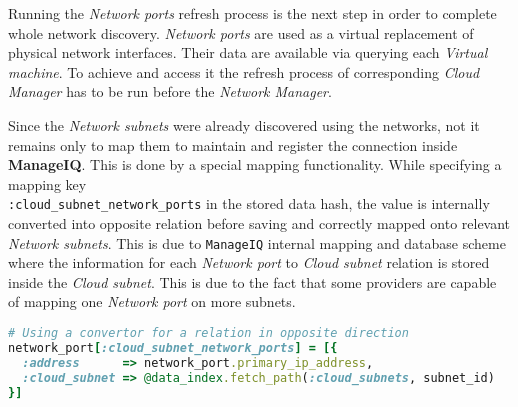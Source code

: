 Running the \emph{Network ports} refresh process is the next step in order to complete whole network discovery. \emph{Network ports} are used as a virtual replacement of physical network interfaces. Their data are available via querying each \emph{Virtual machine}. To achieve and access it the refresh process of corresponding \emph{Cloud Manager} has to be run before the \emph{Network Manager}.

Since the \emph{Network subnets} were already discovered using the networks, not it remains only to map them to maintain and register the connection inside \textbf{ManageIQ}. This is done by a special mapping functionality. While specifying a mapping key \\ \texttt{:cloud\_subnet\_network\_ports} in the stored data hash, the value is internally converted into opposite relation before saving and correctly mapped onto relevant \emph{Network subnets}. This is due to \texttt{ManageIQ} internal mapping and database scheme where the information for each \emph{Network port} to \emph{Cloud subnet} relation is stored inside the \emph{Cloud subnet}. This is due to the fact that some providers are capable of mapping one \emph{Network port} on more subnets.

\begin{lstlisting}[language=Ruby,caption={\emph{Network port} to \emph{Cloud subnet} mapping},label=code:port_to_subnet]
# Using a convertor for a relation in opposite direction
network_port[:cloud_subnet_network_ports] = [{
  :address      => network_port.primary_ip_address,
  :cloud_subnet => @data_index.fetch_path(:cloud_subnets, subnet_id)
}]
\end{lstlisting}

